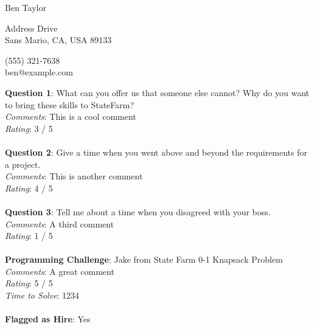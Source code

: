 \documentclass[12pt]{article}
\begin{document}
{\LARGE \begin{center}Ben Taylor\end{center}}

\begin{multicols}{2}
 Address Drive \\
Sans Mario, CA, USA 89133
\columnbreak

\noindent
(555) 321-7638 \\
ben@example.com
\end{multicols}

\noindent
\textbf{Question 1}: What can you offer us that someone else cannot? Why do you want to bring these skills to StateFarm?
\\\noindent
\textit{Comments}: This is a cool comment
\\\noindent
\textit{Rating}: 3 / 5
\\\\
\noindent
\textbf{Question 2}: Give a time when you went above and beyond the requirements for a project.
\\\noindent
\textit{Comments}: This is another comment
\\\noindent
\textit{Rating}: 4 / 5
\\\\
\noindent
\textbf{Question 3}: Tell me about a time when you disagreed with your boss.
\\\noindent
\textit{Comments}: A third comment
\\\noindent
\textit{Rating}: 1 / 5
\\\\
\noindent
\textbf{Programming Challenge}: Jake from State Farm 0-1 Knapsack Problem
\\\noindent
\textit{Comments}: A great  comment
\\\noindent
\textit{Rating}: 5 / 5
\\\noindent
\textit{Time to Solve}: 1234
\\\\
\textbf{Flagged as Hire}: Yes
\\\\ 
\end{document}
